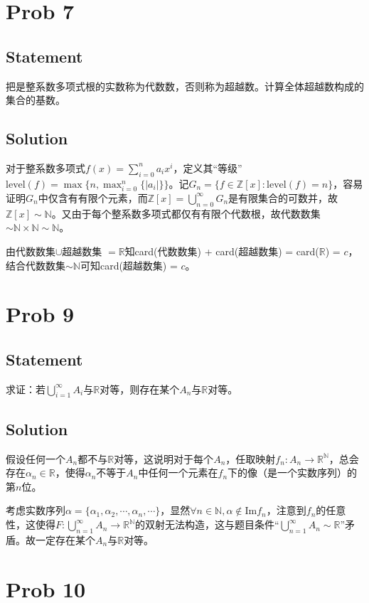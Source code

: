 \documentclass[UTF-8]{ctexart}
\begin{document}
\section{Prob 7}
\subsection{Statement}
把是整系数多项式根的实数称为代数数，否则称为超越数。计算全体超越数构成的集合的基数。
\subsection{Solution}
对于整系数多项式$f(x) = \sum_{i=0}^{n}a_ix^i$，定义其“等级”$\mathrm{level}(f) = \max\{n, \max_{i=0}^{n}\{|a_i|\}\}$。记$G_n = \{f \in \mathbb Z[x]: \mathrm{level}(f) = n\}$，容易证明$G_n$中仅含有有限个元素，而$\mathbb Z[x] = \bigcup_{n=0}^{\infty}G_n$是有限集合的可数并，故$\mathbb Z[x] \sim \mathbb N$。又由于每个整系数多项式都仅有有限个代数根，故代数数集$\sim \mathbb N \times \mathbb N \sim \mathbb N$。

由代数数集$\cup$超越数集 $ = \mathbb R$知card(代数数集) + card(超越数集) = card($\mathbb R$) = $c$，结合代数数集$\sim \mathbb N$可知card(超越数集) = $c$。


\section{Prob 9}
\subsection{Statement}
求证：若$\bigcup_{i=1}^{\infty}A_i$与$\mathbb R$对等，则存在某个$A_n$与$\mathbb R$对等。
\subsection{Solution}

假设任何一个$A_n$都不与$\mathbb R$对等，这说明对于每个$A_n$，任取映射$f_n: A_n \to \mathbb R^{\mathbb N}$，总会存在$\alpha_n \in \mathbb R$，使得$\alpha_n$不等于$A_n$中任何一个元素在$f_n$下的像（是一个实数序列）的第$n$位。

考虑实数序列$\alpha = \{\alpha_1, \alpha_2, \cdots, \alpha_n, \cdots\}$，显然$\forall n \in \mathbb N, \alpha \notin \textrm{Im} f_n$，注意到$f_n$的任意性，这使得$F: \bigcup_{n=1}^{\infty}A_n \to \mathbb R^{\mathbb N}$的双射无法构造，这与题目条件“$\bigcup_{n=1}^{\infty}A_n \sim \mathbb R$”矛盾。故一定存在某个$A_n$与$\mathbb R$对等。

\section{Prob 10}
\end{document}
